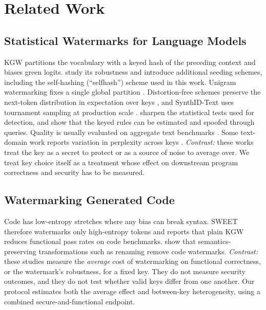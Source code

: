 \section{Related Work}
\label{sec:related}

\subsection{Statistical Watermarks for Language Models}
KGW \citep{kirchenbauer2023watermark} partitions the vocabulary with a keyed hash of the preceding context and biases green logits. \citet{kirchenbauer2024reliability} study its robustness and introduce additional seeding schemes, including the self-hashing (``selfhash'') scheme used in this work. Unigram watermarking fixes a single global partition \citep{zhao2024provable}. Distortion-free schemes preserve the next-token distribution in expectation over keys \citep{kuditipudi2024robust,mao2025unbiased}, and SynthID-Text uses tournament sampling at production scale \citep{dathathri2024scalable}. \citet{fernandez2023threebricks} sharpen the statistical tests used for detection, and \citet{jovanovic2024stealing} show that the keyed rules can be estimated and spoofed through queries. Quality is usually evaluated on aggregate text benchmarks \citep{tu2024waterbench,piet2023markmywords}. Some text-domain work reports variation in perplexity across keys \citep{mao2025unbiased}. \emph{Contrast:} these works treat the key as a secret to protect or as a source of noise to average over. We treat key choice itself as a treatment whose effect on downstream program correctness and security has to be measured.

\subsection{Watermarking Generated Code}
Code has low-entropy stretches where any bias can break syntax. SWEET \citep{lee2024sweet} therefore watermarks only high-entropy tokens and reports that plain KGW reduces functional pass rates on code benchmarks. \citet{suresh2024robust} show that semantics-preserving transformations such as renaming remove code watermarks. \emph{Contrast:} these studies measure the \emph{average} cost of watermarking on functional correctness, or the watermark's robustness, for a fixed key. They do not measure security outcomes, and they do not test whether valid keys differ from one another. Our protocol estimates both the average effect and between-key heterogeneity, using a combined secure-and-functional endpoint.

